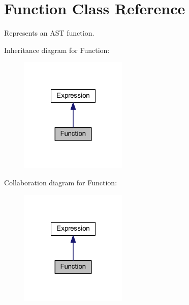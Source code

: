 \hypertarget{class_function}{\section{Function Class Reference}
\label{class_function}
}


Represents an A\-S\-T function.  




Inheritance diagram for Function\-:\nopagebreak
\begin{figure}[H]
\begin{center}
\leavevmode
\includegraphics[width=144pt]{class_function__inherit__graph}
\end{center}
\end{figure}


Collaboration diagram for Function\-:\nopagebreak
\begin{figure}[H]
\begin{center}
\leavevmode
\includegraphics[width=144pt]{class_function__coll__graph}
\end{center}
\end{figure}
